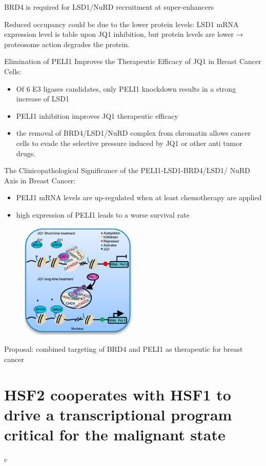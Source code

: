 BRD4 is required for LSD1/NuRD recruitment at super-enhancers

Reduced occupancy could be due to the lower protein levels: LSD1 mRNA
expression level is table upon JQ1 inhibition, but protein levels are
lower → proteosome action degrades the protein.

Elimination of PELI1 Improves the Therapeutic Efficacy of JQ1 in Breast Cancer Cells:
\begin{itemize}
\tightlist
\item
  Of 6 E3 ligases candidates, only PELI1 knockdown results in a strong
  increase of LSD1
\item
  PELI1 inhibition improves JQ1 therapeutic efficacy
\item
  the removal of BRD4/LSD1/NuRD complex from chromatin allows cancer
  cells to evade the selective pressure induced by JQ1 or other anti
  tumor drugs.
\end{itemize}

The Clinicopathological Significance of the
PELI1-LSD1-BRD4/LSD1/ NuRD Axis in Breast
Cancer:

\begin{itemize}
\tightlist
\item
  PELI1 mRNA levels are up-regulated when at least chemotherapy are
  applied
\item
  high expression of PELI1 leads to a worse survival rate
\end{itemize}

\begin{figure}
\centering
\includegraphics[width=0.5\textwidth]{../_resources/Screenshot_2022-10-28_at_11-55-04.png}
\caption{}
\end{figure}

Proposal: combined targeting of BRD4 and PELI1 as therapeutic for breast
cancer

\section{HSF2 cooperates with HSF1 to drive a transcriptional program critical for the malignant state}
c